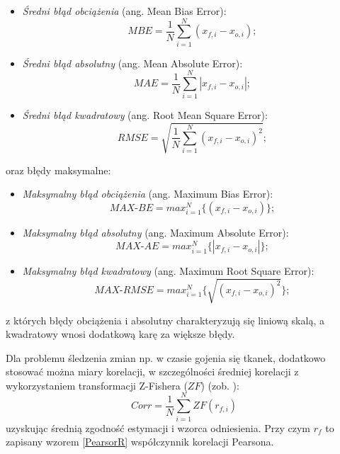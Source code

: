 \begin{itemize}[noitemsep,nolistsep]
\item \textit{Średni błąd obciążenia} (ang. Mean Bias Error): 
\begin{equation}
MBE=\frac1N\sum_{i=1}^N{(x_{f,i}-x_{o,i})};
\end{equation}
\item \textit{Średni błąd absolutny} (ang. Mean Absolute Error):
\begin{equation}
MAE=\frac1N\sum_{i=1}^N\left|x_{f,i}-x_{o,i}\right|;
\end{equation}  
\item \textit{Średni błąd kwadratowy} (ang. Root Mean Square Error):
\begin{equation}
RMSE=\sqrt{\frac1N\sum_{i=1}^N\left(x_{f,i}-x_{o,i}\right)^2};
\end{equation} 
\end{itemize}
oraz błędy maksymalne:
\begin{itemize}[noitemsep,nolistsep]
	\item \textit{Maksymalny błąd obciążenia} (ang. Maximum Bias Error):
	\begin{equation}
	MAX\mbox{-}BE=max_{i=1}^N\{(x_{f,i}-x_{o,i})\};
	\end{equation} 
	\item \textit{Maksymalny błąd absolutny} (ang. Maximum Absolute Error):
	\begin{equation}
	MAX\mbox{-}AE=max_{i=1}^N\{\left|x_{f,i}-x_{o,i}\right|\};
	\end{equation}  
	\item \textit{Maksymalny błąd kwadratowy} (ang. Maximum Root Square Error):
	\begin{equation}
	MAX\mbox{-}RMSE=max_{i=1}^N\{\sqrt{\left(x_{f,i}-x_{o,i}\right)^2}\};
	\end{equation} 
\end{itemize}
z których błędy obciążenia i absolutny charakteryzują się liniową skalą, a kwadratowy wnosi dodatkową karę za większe błędy.   

Dla problemu śledzenia zmian np. w czasie gojenia się tkanek, dodatkowo stosować można miary korelacji, w szczególności średniej korelacji z wykorzystaniem transformacji Z-Fishera ($ZF$) (zob. \cite{Corey1998}):
\begin{equation}
Corr=\frac1N\sum_{i=1}^N{ZF(r_{f,i})}
\end{equation} uzyskując średnią zgodność estymacji i wzorca odniesienia. Przy czym $r_f$ to zapisany wzorem \ref{PearsorR} współczynnik korelacji Pearsona. 

